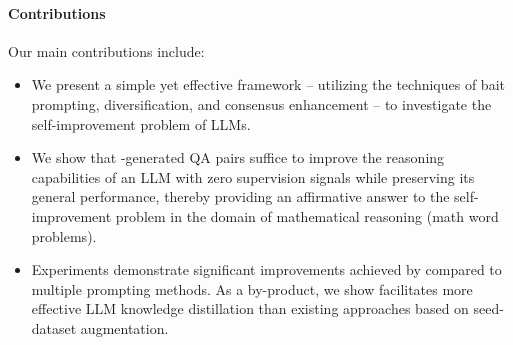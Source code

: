 \paragraph*{\bf Contributions}
Our main contributions include:
\begin{itemize}
    \item We present a simple yet effective framework {\langname} -- utilizing the techniques of bait prompting, diversification, and consensus enhancement -- to investigate the self-improvement problem of LLMs.
    \item We show that {\langname}-generated QA pairs suffice to improve the reasoning capabilities of an LLM with zero supervision signals while preserving its general performance, thereby providing an affirmative answer to the self-improvement problem in the domain of mathematical reasoning (math word problems).
    \item Experiments demonstrate significant improvements achieved by {\langname} compared to multiple prompting methods. %
    As a by-product, we show {\langname} facilitates more effective %
    LLM knowledge distillation than existing approaches based on seed-dataset augmentation.
\end{itemize}






